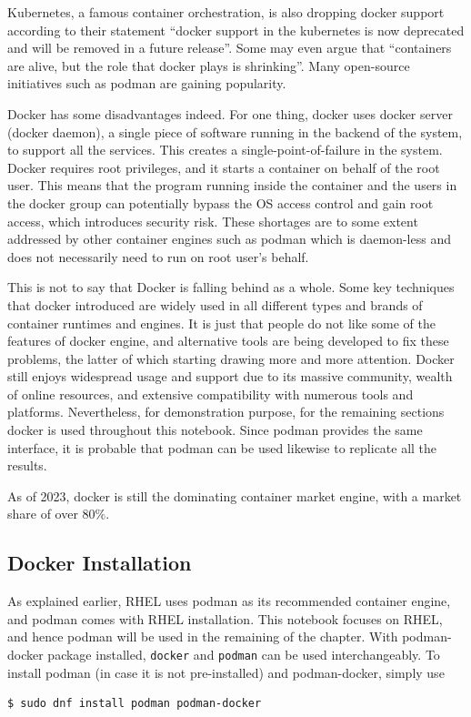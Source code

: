 Kubernetes, a famous container orchestration, is also dropping docker support according to their statement ``docker support in the kubernetes is now deprecated and will be removed in a future release''. Some may even argue that ``containers are alive, but the role that docker plays is shrinking''. Many open-source initiatives such as podman are gaining popularity.

Docker has some disadvantages indeed. For one thing, docker uses docker server (docker daemon), a single piece of software running in the backend of the system, to support all the services. This creates a single-point-of-failure in the system. Docker requires root privileges, and it starts a container on behalf of the root user. This means that the program running inside the container and the users in the docker group can potentially bypass the OS access control and gain root access, which introduces security risk. These shortages are to some extent addressed by other container engines such as podman which is daemon-less and does not necessarily need to run on root user's behalf.

This is not to say that Docker is falling behind as a whole. Some key techniques that docker introduced are widely used in all different types and brands of container runtimes and engines. It is just that people do not like some of the features of docker engine, and alternative tools are being developed to fix these problems, the latter of which starting drawing more and more attention. Docker still enjoys widespread usage and support due to its massive community, wealth of online resources, and extensive compatibility with numerous tools and platforms. Nevertheless, for demonstration purpose, for the remaining sections docker is used throughout this notebook. Since podman provides the same interface, it is probable that podman can be used likewise to replicate all the results.

As of 2023, docker is still the dominating container market engine, with a market share of over $80\%$.

\subsection{Docker Installation}

As explained earlier, RHEL uses podman as its recommended container engine, and podman comes with RHEL installation. This notebook focuses on RHEL, and hence podman will be used in the remaining of the chapter. With podman-docker package installed, \verb|docker| and \verb|podman| can be used interchangeably. To install podman (in case it is not pre-installed) and podman-docker, simply use
\begin{lstlisting}
$ sudo dnf install podman podman-docker
\end{lstlisting}

